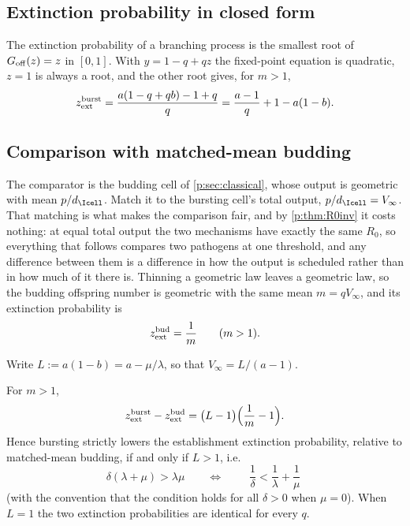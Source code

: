 \subsection{Extinction probability in closed form}

The extinction probability of a branching process is the smallest root of
$G_{\rm off}(z)=z$ in $[0,1]$. With $y=1-q+qz$ the fixed-point equation is
quadratic, $z=1$ is always a root, and the other root gives, for $m>1$,
\begin{equation}
z_{\rm ext}^{\rm burst}
=\frac{a(1-q+qb)-1+q}{q}
=\frac{a-1}{q}+1-a(1-b).
\label{p:eq:zext}
\end{equation}

\subsection{Comparison with matched-mean budding}

The comparator is the budding cell of \cref{p:sec:classical}, whose output
is geometric with mean $p/d_{\Icell}$. Match it to the bursting cell's total
output, $p/d_{\Icell}=V_\infty$. That matching is what makes the comparison
fair, and by \cref{p:thm:R0inv} it costs nothing: at equal total output the
two mechanisms have exactly the same $R_0$, so everything that follows
compares two pathogens at one threshold, and any difference between them is
a difference in how the output is scheduled rather than in how much of it
there is. Thinning a geometric law leaves a geometric
law, so the budding offspring number is geometric with the same mean
$m=qV_\infty$, and its extinction probability is
\begin{equation}
z_{\rm ext}^{\rm bud}=\frac{1}{m}\qquad(m>1).
\label{p:eq:zextbud}
\end{equation}

Write $L:=a(1-b)=a-\mu/\lambda$, so that $V_\infty=L/(a-1)$.

\begin{theorem}
\label{p:thm:flood}
For $m>1$,
\begin{equation}
z_{\rm ext}^{\rm burst}-z_{\rm ext}^{\rm bud}
=\bigl(L-1\bigr)\Bigl(\frac{1}{m}-1\Bigr).
\label{p:eq:flood}
\end{equation}
Hence bursting strictly lowers the establishment extinction probability,
relative to matched-mean budding, if and only if $L>1$, i.e.
\begin{equation}
\delta(\lambda+\mu)>\lambda\mu
\qquad\Longleftrightarrow\qquad
\boxed{\;\frac{1}{\delta}<\frac{1}{\lambda}+\frac{1}{\mu}\;}
\label{p:eq:floodcrit}
\end{equation}
(with the convention that the condition holds for all $\delta>0$ when
$\mu=0$). When $L=1$ the two extinction probabilities are identical for
every $q$.
\end{theorem}

